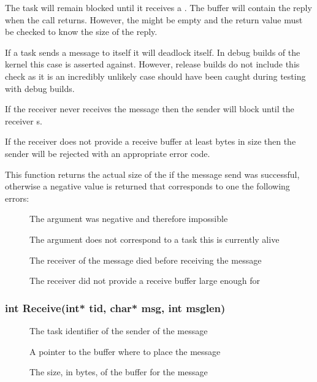 \documentclass[pdftex,10pt,a4paper]{article}
\begin{document}
The task will remain blocked until it receives a . The
 buffer will contain the reply when the call
returns. However, the  might be empty and the return value
must be checked to know the size of the reply.

If a task sends a message to itself it will deadlock itself. In debug
builds of the kernel this case is asserted against. However, release
builds do not include this check as it is an incredibly unlikely case
should have been caught during testing with debug builds.

If the receiver never receives the message then the sender will block
until the receiver s.

If the receiver does not provide a receive buffer at least
 bytes in size then the sender will be rejected with an
appropriate error code.

This function returns the actual size of the  if the
message send was successful, otherwise a negative value is returned
that corresponds to one the following errors:

\begin{description}
\item[] The  argument was negative
  and therefore impossible
\item[] The  argument does not
  correspond to a task this is currently alive
\item[] The receiver of the message died before
  receiving the message
\item[] The receiver did not provide a
  receive buffer large enough for 
\end{description}


\newpage
\subsubsection*{int Receive(int* tid, char* msg, int msglen)}

\begin{description}
\item[] The task identifier of the sender of the message
\item[] A pointer to the buffer where to place the message
\item[] The size, in bytes, of the buffer for the message
\end{description}
\end{document}

